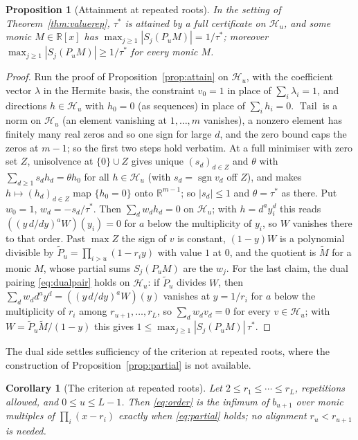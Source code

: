 \documentclass[11pt]{article}
\newtheorem{corollary}[theorem]{Corollary}
\newtheorem{proposition}[theorem]{Proposition}
\theoremstyle{definition}
\theoremstyle{plain}
\newcommand{\R}{\mathbb R}
\DeclareMathOperator{\Tail}{Tail}
\DeclareMathOperator{\sgn}{sgn}
\begin{document}
\begin{proposition}[Attainment at repeated roots]\label{prop:attainrep}
In the setting of Theorem~\ref{thm:valuerep}, $\tau^*$ is attained by a full
certificate on $\mathcal H_u$, and some monic $M\in\R[x]$ has
$\max_{j\ge1}|S_j(P_uM)|=1/\tau^*$; moreover
$\max_{j\ge1}|S_j(P_uM)|\ge1/\tau^*$ for every monic $M$.
\end{proposition}

\begin{proof}
Run the proof of Proposition~\ref{prop:attain} on $\mathcal H_u$, with the
coefficient vector $\lambda$ in the Hermite basis, the constraint $v_0=1$ in
place of $\sum_i\lambda_i=1$, and directions $h\in\mathcal H_u$ with $h_0=0$
(as sequences) in place of $\sum_ih_i=0$.  $\Tail$ is a
norm on $\mathcal H_u$ (an element vanishing at $1,\ldots,m$ vanishes), a
nonzero element has finitely many real zeros and so one sign for large $d$,
and the zero bound caps the zeros at $m-1$; so the first two steps hold
verbatim.  At a full minimiser with zero set $Z$, unisolvence at
$\{0\}\cup Z$ gives unique $(s_d)_{d\in Z}$ and $\theta$ with
$\sum_{d\ge1}s_dh_d=\theta h_0$ for all $h\in\mathcal H_u$ (with
$s_d=\sgn v_d$ off $Z$), and makes $h\mapsto(h_d)_{d\in Z}$ map
$\{h_0=0\}$ onto $\R^{m-1}$; so $|s_d|\le1$ and $\theta=\tau^*$ as there.
Put $w_0=1$, $w_d=-s_d/\tau^*$.  Then $\sum_dw_dh_d=0$ on $\mathcal H_u$;
with $h=d^ay_i^d$ this reads $((y\,d/dy)^aW)(y_i)=0$ for $a$ below the
multiplicity of $y_i$, so $W$ vanishes there to that order.  Past $\max Z$
the sign of $v$ is constant, $(1-y)W$ is a polynomial divisible by
$\widetilde P_u=\prod_{i>u}(1-r_iy)$ with value $1$ at $0$, and the quotient
is $\widetilde M$ for a monic $M$, whose partial sums $S_j(P_uM)$ are the
$w_j$.  For the last claim, the dual pairing \eqref{eq:dualpair} holds on
$\mathcal H_u$: if $\widetilde P_u$ divides $W$, then
$\sum_dw_dd^ay^d=((y\,d/dy)^aW)(y)$ vanishes at $y=1/r_i$ for $a$ below the
multiplicity of $r_i$ among $r_{u+1},\ldots,r_L$, so $\sum_dw_dv_d=0$ for
every $v\in\mathcal H_u$; with $W=\widetilde P_u\widetilde M/(1-y)$ this
gives $1\le\max_{j\ge1}|S_j(P_uM)|\,\tau^*$.
\end{proof}

The dual side settles sufficiency of the criterion at repeated roots, where
the construction of Proposition~\ref{prop:partial} is not available.

\begin{corollary}[The criterion at repeated roots]\label{cor:charrep}
Let $2\le r_1\le\cdots\le r_L$, repetitions allowed, and $0\le u\le L-1$.
Then \eqref{eq:order} is the infimum of $b_{u+1}$ over monic multiples of
$\prod_i(x-r_i)$ exactly when \eqref{eq:partial} holds; no alignment
$r_u<r_{u+1}$ is needed.
\end{corollary}
\end{document}
